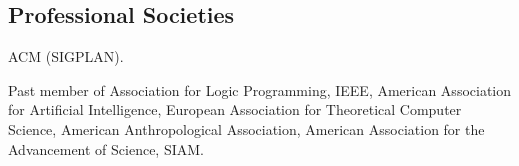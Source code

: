 \documentclass{article}
\begin{document}
\subsection*{Professional Societies}


ACM (SIGPLAN). 

Past member of Association for Logic Programming, IEEE, American
Association for Artificial Intelligence, European Association for
Theoretical Computer Science, American Anthropological Association,
American Association for the Advancement of Science, SIAM.
\end{document}
